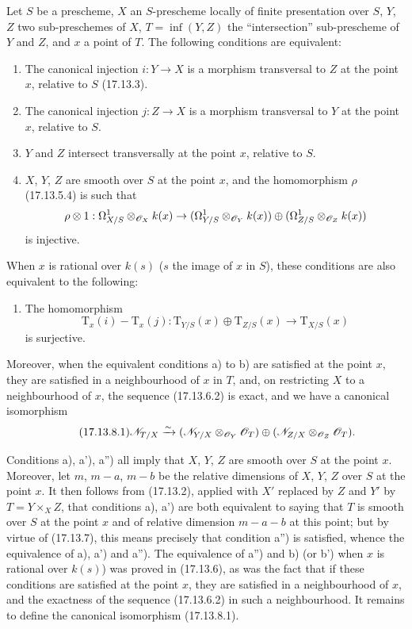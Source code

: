 \begin{proposition}[17.13.8]
\label{IV.17.13.8}
Let $S$ be a prescheme, $X$ an $S$-prescheme locally of finite presentation over $S$, $Y$, $Z$ two sub-preschemes of $X$, $T=\inf(Y,Z)$ the ``intersection'' sub-prescheme of $Y$ and $Z$, and $x$ a point of $T$. The following conditions are equivalent:
\begin{enumerate}
  \item[a)] The canonical injection $i:Y\to X$ is a morphism transversal to $Z$ at the point $x$, relative to $S$ (17.13.3).
  \item[a')] The canonical injection $j:Z\to X$ is a morphism transversal to $Y$ at the point $x$, relative to $S$.
  \item[a'')] $Y$ and $Z$ intersect transversally at the point $x$, relative to $S$.
  \item[b)] $X$, $Y$, $Z$ are smooth over $S$ at the point $x$, and the homomorphism $\rho$ (17.13.5.4) is such that
  \[
  \rho\otimes1:\Omega^1_{X/S}\otimes_{\mathscr{O}_X}k(x)\to
  (\Omega^1_{Y/S}\otimes_{\mathscr{O}_Y}k(x))\oplus
  (\Omega^1_{Z/S}\otimes_{\mathscr{O}_Z}k(x))
  \]
  is injective.
\end{enumerate}
When $x$ is rational over $k(s)$ ($s$ the image of $x$ in $S$), these conditions are also equivalent to the following:
\begin{enumerate}
  \item[b')] The homomorphism
  \[
  \mathrm{T}_x(i)-\mathrm{T}_x(j):\mathrm{T}_{Y/S}(x)\oplus\mathrm{T}_{Z/S}(x)\to\mathrm{T}_{X/S}(x)
  \]
  is surjective.
\end{enumerate}
Moreover, when the equivalent conditions a) to b) are satisfied at the point $x$, they are satisfied in a neighbourhood of $x$ in $T$, and, on restricting $X$ to a neighbourhood of $x$, the sequence (17.13.6.2) is exact, and we have a canonical isomorphism
\[
\label{IV.17.13.8.1}
\tag{17.13.8.1}
\mathscr{N}_{T/X}\xrightarrow{\sim}
(\mathscr{N}_{Y/X}\otimes_{\mathscr{O}_Y}\mathscr{O}_T)\oplus
(\mathscr{N}_{Z/X}\otimes_{\mathscr{O}_Z}\mathscr{O}_T).
\]
\end{proposition}

Conditions a), a'), a'') all imply that $X$, $Y$, $Z$ are smooth over $S$ at the point $x$. Moreover, let $m$, $m-a$, $m-b$ be the relative dimensions of $X$, $Y$, $Z$ over $S$ at the point $x$. It then follows from (17.13.2), applied with $X'$ replaced by $Z$ and $Y'$ by $T=Y\times_XZ$, that conditions a), a') are both equivalent to saying that $T$ is smooth over $S$ at the point $x$ and of relative dimension $m-a-b$ at this point; but by virtue of (17.13.7), this means precisely that condition a'') is satisfied, whence the equivalence of a), a') and a''). The equivalence of a'') and b) (or b') when $x$ is rational over $k(s)$) was proved in (17.13.6), as was the fact that if these conditions are satisfied at the point $x$, they are satisfied in a neighbourhood of $x$, and the exactness of the sequence (17.13.6.2) in such a neighbourhood. It remains to define the canonical isomorphism (17.13.8.1).

